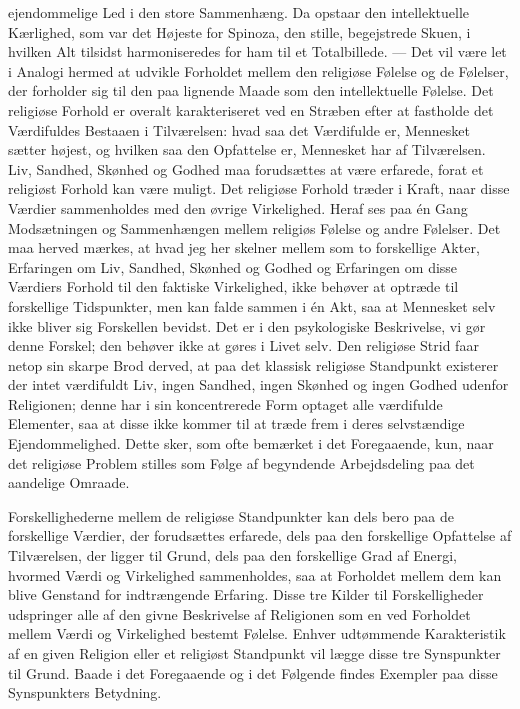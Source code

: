 \documentclass[12pt,a4paper,openany]{book}
\newcommand{\opage}[1]{\marginnote{\footnotesize\textit{[#1]}}}
\begin{document}
ejendommelige Led i den store Sammenhæng. Da opstaar den intellektuelle
Kærlighed, som var det Højeste for Spinoza, den stille, begejstrede
Skuen, i hvilken Alt tilsidst harmoniseredes for ham til et
Totalbillede. --- Det vil være let i Analogi hermed at udvikle Forholdet
mellem den religiøse Følelse og de Følelser, der forholder sig til den
paa lignende Maade som den intellektuelle Følelse. Det religiøse Forhold
er overalt karakteriseret ved en Stræben efter at fastholde det
Værdifuldes Bestaaen i Tilværelsen: hvad saa det Værdifulde er,
Mennesket sætter højest, og hvilken saa den Opfattelse er, Mennesket har
af Tilværelsen. Liv, Sandhed, Skønhed og Godhed maa forudsættes at være
erfarede, forat et religiøst Forhold kan være muligt. Det religiøse
Forhold træder i Kraft, naar disse Værdier sammenholdes med den øvrige
Virkelighed. Heraf ses paa én Gang Modsætningen og Sammenhængen mellem
religiøs Følelse og andre Følelser. Det maa herved mærkes, at hvad jeg
her skelner mellem som to forskellige Akter, Erfaringen om Liv, Sandhed,
Skønhed og Godhed og Erfaringen om disse Værdiers Forhold til den
faktiske Virkelighed, ikke behøver at optræde til forskellige
Tidspunkter, men kan falde sammen i én Akt, saa at Mennesket selv ikke
bliver sig Forskellen bevidst. Det er i den psykologiske Beskrivelse, vi
gør denne Forskel; den behøver ikke at gøres i Livet selv. Den religiøse
Strid faar netop sin skarpe Brod derved, at paa det klassisk religiøse
Standpunkt existerer der intet værdifuldt Liv, ingen Sandhed, ingen
Skønhed og ingen Godhed udenfor Religionen; denne har i sin
koncentrerede Form optaget alle værdifulde Elementer, saa at disse ikke
kommer til at træde frem i deres selvstændige Ejendommelighed. Dette
sker, som ofte bemærket i det Foregaaende, kun, naar det religiøse
Problem stilles som Følge af begyndende Arbejdsdeling paa det aandelige
Omraade.

Forskellighederne mellem de religiøse Standpunkter kan dels bero paa de
forskellige Værdier, der forudsættes erfarede, dels paa den forskellige
Opfattelse af Tilværelsen, der ligger til Grund, dels paa den
forskellige Grad af Energi, hvormed Værdi og Virkelighed sammenholdes,
saa at Forholdet mellem dem kan blive
\opage{68}Genstand for indtrængende Erfaring. Disse tre Kilder til
Forskelligheder udspringer alle af den givne Beskrivelse af Religionen
som en ved Forholdet mellem Værdi og Virkelighed bestemt Følelse. Enhver
udtømmende Karakteristik af en given Religion eller et religiøst
Standpunkt vil lægge disse tre Synspunkter til Grund. Baade i det
Foregaaende og i det Følgende findes Exempler paa disse Synspunkters
Betydning.
\end{document}
